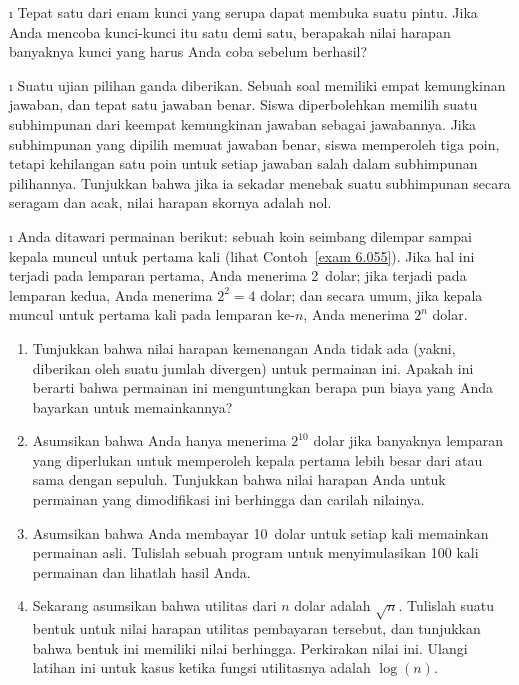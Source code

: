 \begin{LJSItem}
\i\label{exer 6.1.19} Tepat satu dari enam kunci yang serupa dapat membuka suatu pintu. Jika
Anda mencoba kunci-kunci itu satu demi satu, berapakah nilai harapan banyaknya kunci yang harus
Anda coba sebelum berhasil?

\i\label{exer 6.1.20} Suatu ujian pilihan ganda diberikan. Sebuah soal memiliki empat
kemungkinan jawaban, dan tepat satu jawaban benar. Siswa diperbolehkan
memilih suatu subhimpunan dari keempat kemungkinan jawaban sebagai jawabannya. Jika subhimpunan yang dipilih
memuat jawaban benar, siswa memperoleh tiga poin, tetapi kehilangan satu
poin untuk setiap jawaban salah dalam subhimpunan pilihannya. Tunjukkan bahwa jika ia sekadar menebak suatu
subhimpunan secara seragam dan acak, nilai harapan skornya adalah nol.

\i\label{exer 6.1.21} Anda ditawari permainan berikut: sebuah koin seimbang
dilempar sampai kepala muncul untuk pertama kali (lihat Contoh~\ref{exam 6.055}). Jika
hal ini terjadi pada lemparan pertama, Anda menerima 2~dolar; jika terjadi pada lemparan kedua,
Anda menerima $2^2 = 4$ dolar; dan secara umum, jika kepala muncul untuk pertama kali
pada lemparan ke-$n$, Anda menerima $2^n$ dolar.

\begin{enumerate}
\item Tunjukkan bahwa nilai harapan kemenangan Anda tidak ada (yakni, diberikan oleh
suatu jumlah divergen) untuk permainan ini. Apakah ini berarti bahwa permainan ini menguntungkan berapa pun
biaya yang Anda bayarkan untuk memainkannya?

\item Asumsikan bahwa Anda hanya menerima $2^{10}$ dolar jika banyaknya lemparan yang diperlukan untuk memperoleh kepala pertama
lebih besar dari atau sama dengan sepuluh. Tunjukkan bahwa nilai harapan Anda
untuk permainan yang dimodifikasi ini berhingga dan carilah nilainya.

\item Asumsikan bahwa Anda membayar 10~dolar untuk setiap kali memainkan permainan asli. Tulislah sebuah
program untuk menyimulasikan 100 kali permainan dan lihatlah hasil Anda.

\item Sekarang asumsikan bahwa utilitas dari $n$ dolar adalah $\sqrt n$. Tulislah suatu bentuk
untuk nilai harapan utilitas pembayaran tersebut, dan tunjukkan bahwa bentuk ini memiliki nilai
berhingga. Perkirakan nilai ini. Ulangi latihan ini untuk kasus ketika fungsi
utilitasnya adalah $\log(n)$.


\end{enumerate}
\end{LJSItem}
